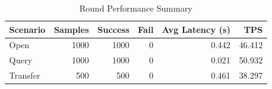 \begin{table}
\caption{Round Performance Summary}
\label{tab:round_perf}
\begin{tabular}{lrrrrr}
\toprule
Scenario & Samples & Success & Fail & Avg Latency (s) & TPS \\
\midrule
Open & 1000 & 1000 & 0 & 0.442 & 46.412 \\
Query & 1000 & 1000 & 0 & 0.021 & 50.932 \\
Transfer & 500 & 500 & 0 & 0.461 & 38.297 \\
\bottomrule
\end{tabular}
\end{table}
